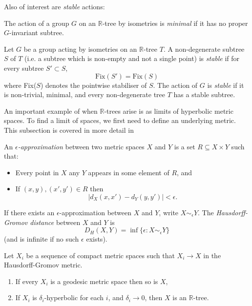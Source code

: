 Also of interest are \textit{stable} actions:
\begin{definition}
    The action of a group $G$ on an $\mathbb{R}$-tree by isometries is \emph{minimal} if it has no proper $G$-invariant subtree.
\end{definition}

\begin{definition}
    Let $G$ be a group acting by isometries on an $\mathbb{R}$-tree $T$. A  non-degenerate subtree $S$ of $T$ (i.e. a subtree which is non-empty and not a single point) is \emph{stable} if for every subtree $S'\subset S$, \[\text{Fix}(S')=\text{Fix}(S)\] where Fix($S$) denotes the pointwise stabiliser of $S$. The action of $G$ is \emph{stable} if it is non-trivial, minimal, and every non-degenerate tree $T$ has a stable subtree.
\end{definition}

An important example of when $\mathbb{R}$-trees arise is as limits of hyperbolic metric spaces. To find a limit of spaces, we first need to define an underlying metric. This subsection is covered in more detail in \cite{BridsonSwarup}

\begin{definition}
    An $\epsilon$\emph{-approximation} between two metric spaces $X$ and $Y$ is a set $R\subseteq X\times Y$ such that:
    \begin{itemize}
        \item Every point in $X$ any $Y$ appears in some element of $R$, and
        \item If $(x,y),(x',y')\in R$ then \[\lvert d_X(x,x')-d_Y(y,y')\rvert<\epsilon.\]
    \end{itemize}
    If there exists an $\epsilon$-approximation between $X$ and $Y$, write $X\sim_\epsilon Y$. The \emph{Hausdorff-Gromov distance} between $X$ and $Y$ is \[D_H(X,Y)=\inf\{\epsilon:X\sim_\epsilon Y\}\] (and is infinite if no such $\epsilon$ exists).
\end{definition}

\begin{theorem}\label{limittrees}
    Let $X_i$ be a sequence of compact metric spaces such that $X_i\rightarrow X$ in the Hausdorff-Gromov metric.
    \begin{enumerate}
        \item If every $X_i$ is a geodesic metric space then so is $X$,
        \item If $X_i$ is $\delta_i$-hyperbolic for each $i$, and $\delta_i\rightarrow 0$, then $X$ is an $\mathbb{R}$-tree. 
    \end{enumerate}
\end{theorem}

